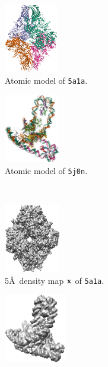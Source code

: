 \begin{figure}[ht!]
    \centering
    \begin{minipage}[b]{0.50\linewidth}
        \centering
        \begin{subfigure}[b]{0.49\linewidth}
            \centering
            \includegraphics[height=3cm]{figures/5a1a_pdb.png}
            \caption{Atomic model of \texttt{5a1a}.}
        \end{subfigure}
        \hfill
        \begin{subfigure}[b]{0.49\linewidth}
            \centering
            \includegraphics[height=3cm]{figures/5j0n_pdb_.png}
            \caption{Atomic model of \texttt{5j0n}.}
        \end{subfigure}
        \\ \vspace{0.5em}
        \begin{subfigure}[b]{0.49\linewidth}
            \centering
            \includegraphics[height=3cm]{figures/5a1a_5A.png}
            \caption{5\AA\ density map $\mathbf{x}$ of \texttt{5a1a}.}%
            \label{fig:density-map:5j0n:ground-truth}
        \end{subfigure}
        \hfill
        \begin{subfigure}[b]{0.49\linewidth}
            \centering
            \includegraphics[height=3cm]{figures/5j0n_5A.png}

\end{subfigure}
\end{minipage}
\end{figure}
